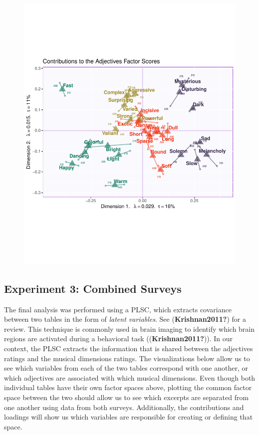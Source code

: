 \documentclass[
  english,
  man,floatsintext]{apa6}
\begin{document}
\begin{figure}

{\centering \includegraphics{Music-Descriptor-Space_files/figure-latex/mfasbs-3} 

}

\caption{ }\label{fig:mfasbs-3}
\end{figure}

\hypertarget{experiment-3-combined-surveys}{%
\subsection{Experiment 3: Combined Surveys}\label{experiment-3-combined-surveys}}

The final analysis was performed using a PLSC, which extracts covariance between two tables in the form of \emph{latent variables}. See (\textbf{Krishnan2011?}) for a review. This technique is commonly used in brain imaging to identify which brain regions are activated during a behavioral task ((\textbf{Krishnan2011?})). In our context, the PLSC extracts the information that is shared between the adjectives ratings and the musical dimensions ratings. The visualizations below allow us to see which variables from each of the two tables correspond with one another, or which adjectives are associated with which musical dimensions. Even though both individual tables have their own factor spaces above, plotting the common factor space between the two should allow us to see which excerpts are separated from one another using data from both surveys. Additionally, the contributions and loadings will show us which variables are responsible for creating or defining that space.
\end{document}
